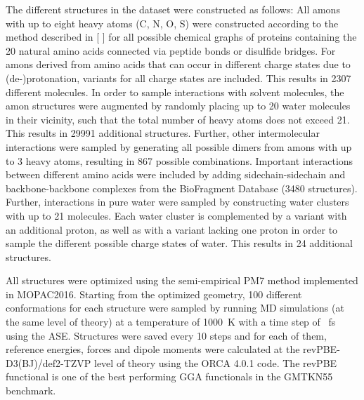 \documentclass[12pt]{article}
\makeatletter
\DeclareRobustCommand\citenum
{\begingroup
	\NAT@swatrue\let\NAT@ctype\z@\NAT@parfalse\let\textsuperscript\relax \NAT@citexnum[][]}
\makeatother
\begin{document}
\noindent
The different structures in the dataset were constructed as follows:
All amons with up to eight heavy atoms (C, N, O, S) were constructed
according to the method described in [\citenum{huang2017chemical}] for
all possible chemical graphs of proteins containing the \num{20}
natural amino acids connected via peptide bonds or disulfide
bridges. For amons derived from amino acids that can occur in
different charge states due to (de-)protonation, variants for all
charge states are included. This results in \num{2307} different
molecules. In order to sample interactions with solvent molecules, the
amon structures were augmented by randomly placing up to \num{20}
water molecules in their vicinity, such that the total number of heavy
atoms does not exceed \num{21}. This results in \num{29991} additional
structures. Further, other intermolecular interactions were sampled by
generating all possible dimers from amons with up to \num{3} heavy
atoms, resulting in \num{867} possible combinations. Important
interactions between different amino acids were included by adding
sidechain-sidechain and backbone-backbone complexes from the
BioFragment Database\cite{burns2017biofragment} (\num{3480}
structures). Further, interactions in pure water were sampled by
constructing water clusters with up to \num{21} molecules. Each water
cluster is complemented by a variant with an additional proton, as
well as with a variant lacking one proton in order to sample the
different possible charge states of water. This results in \num{24}
additional structures.

All structures were optimized using the semi-empirical PM7
method\cite{stewart2013optimization} implemented in
MOPAC2016.\cite{mopac2016} Starting from the optimized geometry,
\num{100} different conformations for each structure were sampled by
running MD simulations (at the same level of theory) at a temperature
of \num{1000}~K with a time step of ~fs using the
ASE.\cite{larsen2017atomic} Structures were saved every \num{10} steps
and for each of them, reference energies, forces and dipole moments
were calculated at the
revPBE-D3(BJ)/def2-TZVP\cite{zhang1998comment,grimme2010consistent,grimme2011effect,weigend2005balanced}
level of theory using the ORCA 4.0.1
code.\cite{neese2012orca,neese2018software} The revPBE functional is
one of the best performing GGA functionals in the GMTKN55
benchmark.\cite{goerigk2017look}
\end{document}
